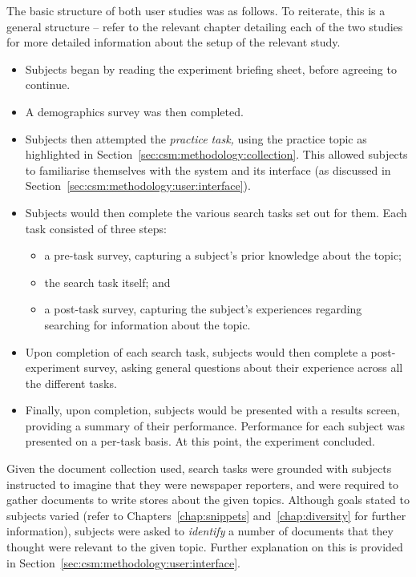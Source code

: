 The basic structure of both user studies was as follows. To reiterate, this is a general structure -- refer to the relevant chapter detailing each of the two studies for more detailed information about the setup of the relevant study.

\begin{itemize}
    \item{Subjects began by reading the experiment briefing sheet, before agreeing to continue.}
    \item{A demographics survey was then completed.}
    \item{Subjects then attempted the \emph{practice task,} using the practice topic as highlighted in Section~\ref{sec:csm:methodology:collection}. This allowed subjects to familiarise themselves with the system and its interface (as discussed in Section~\ref{sec:csm:methodology:user:interface}).}
    \item{Subjects would then complete the various search tasks set out for them. Each task consisted of three steps:}
    
    \begin{itemize}
        \item{a pre-task survey, capturing a subject's prior knowledge about the topic;}
        \item{the search task itself; and}
        \item{a post-task survey, capturing the subject's experiences regarding searching for information about the topic.}
    \end{itemize}
    
    \item{Upon completion of each search task, subjects would then complete a post-experiment survey, asking general questions about their experience across all the different tasks.}
    \item{Finally, upon completion, subjects would be presented with a results screen, providing a summary of their performance. Performance for each subject was presented on a per-task basis. At this point, the experiment concluded.}
\end{itemize}

Given the document collection used, search tasks were grounded with subjects instructed to imagine that they were newspaper reporters, and were required to gather documents to write stores about the given topics. Although goals stated to subjects varied (refer to Chapters~\ref{chap:snippets} and~\ref{chap:diversity} for further information), subjects were asked to \emph{identify} a number of documents that they thought were relevant to the given topic. Further explanation on this is provided in Section~\ref{sec:csm:methodology:user:interface}.

